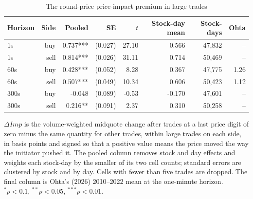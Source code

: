 \begin{table}[htbp]
\centering
\caption{The round-price price-impact premium in large trades}
\label{tab:dimp}
\small
\begin{threeparttable}
\begin{tabular}{@{}lrrrrrrr@{}}
\toprule
Horizon & Side & Pooled & SE & $t$ & Stock-day mean & Stock-days & Ohta \\
\midrule
1s & buy & 0.737*** & (0.027) & 27.10 & 0.566 & 47,832 & -- \\
1s & sell & 0.814*** & (0.026) & 31.11 & 0.714 & 50,469 & -- \\
60s & buy & 0.428*** & (0.052) & 8.28 & 0.367 & 47,775 & 1.26 \\
60s & sell & 0.507*** & (0.049) & 10.34 & 0.606 & 50,423 & 1.12 \\
300s & buy & -0.048 & (0.089) & -0.53 & -0.170 & 47,601 & -- \\
300s & sell & 0.216** & (0.091) & 2.37 & 0.310 & 50,258 & -- \\
\bottomrule
\end{tabular}
\begin{tablenotes}[flushleft]\footnotesize
\item $\Delta\mathit{Imp}$ is the volume-weighted midquote change after trades at a last price digit of zero minus the same quantity for other trades, within large trades on each side, in basis points and signed so that a positive value means the price moved the way the initiator pushed it. The pooled column removes stock and day effects and weights each stock-day by the smaller of its two cell counts; standard errors are clustered by stock and by day. Cells with fewer than five trades are dropped. The final column is Ohta's (2026) 2010--2022 mean at the one-minute horizon. $^{*}p<0.1$, $^{**}p<0.05$, $^{***}p<0.01$.
\end{tablenotes}
\end{threeparttable}
\end{table}
